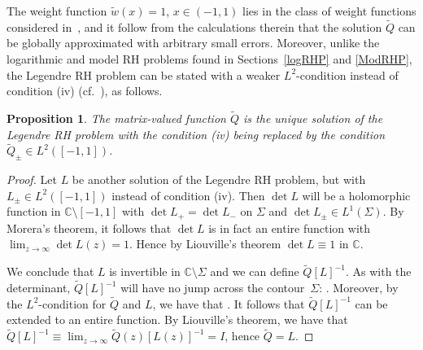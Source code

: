 \documentclass[11pt]{article}
\numberwithin{equation}{section}
\newcommand{\C}{\mathbb{C}}
\newcommand{\Id}{I}
\newcommand{\tw}{\widetilde w}
\newcommand{\tQ}{{\widetilde Q}}
\newtheorem{Proposition}[Theorem]{Proposition}
 { \theoremstyle{definition}
\newtheorem{Definition}[Theorem]{Definition}
\newtheorem{Note}[Theorem]{Note}
\newtheorem{Example}[Theorem]{Example}
\newtheorem{Remark}[Theorem]{Remark} }
\numberwithin{equation}{section}
\begin{document}
The weight function $\tw(x) = 1$, $x\in(-1,1)$ lies in the class of weight functions considered in~\cite{KMVV}, and it follow from the calculations therein that the solution $\tQ$ can be globally approximated with arbitrary small errors. Moreover, unlike the logarithmic and model RH problems found in Sections~\ref{logRHP} and \ref{ModRHP}, the Legendre RH problem can be stated with a weaker $L^2$-condition instead of condition (iv) (cf.\ \cite[Proposition~3.2]{CD}), as follows.

\begin{Proposition}\label{LegUniq}
 The matrix-valued function $\tQ$ is the unique solution of the Legendre RH problem with the condition \emph{(iv)} being replaced by the condition $\tQ_\pm \in L^2([-1,1])$.
\end{Proposition}
\begin{proof}
Let $L$ be another solution of the Legendre RH problem, but with $L_\pm\in L^2([-1,1])$ instead of condition (iv). Then $\det L$ will be a holomorphic function in $\C \setminus [-1,1]$ with
$\det L_+ = \det L_-$ on $\Sigma$ and $\det L_\pm \in L^1(\Sigma)$. By Morera's theorem, it follows that $\det L$ is in fact an entire function with $\lim_{z\to\infty} \det L(z) = 1$. Hence by Liouville's theorem $\det L \equiv 1$ in $\C$.

We conclude that $L$ is invertible in $\C \setminus \Sigma$ and we can define $\tQ[L]^{-1}$. As with the determinant, $\tQ[L]^{-1}$ will have no jump across the contour~$\Sigma$: \smash{$\big(\tQ[L]^{-1}\big)_+=\big(\tQ[L]^{-1}\big)_-$}. Moreover, by the $L^2$-condition for $\tQ$ and $L$, we have that \smash{$\big(\tQ[L]^{-1}\big)_\pm \in L^1(\Sigma)$}. It follows that $\tQ[L]^{-1}$ can be extended to an entire function. By Liouville's theorem, we have that $\tQ[L]^{-1} \equiv \lim_{z\to\infty} \tQ(z)[L(z)]^{-1} = \Id$, hence $\tQ = L$.
\end{proof}
\end{document}

